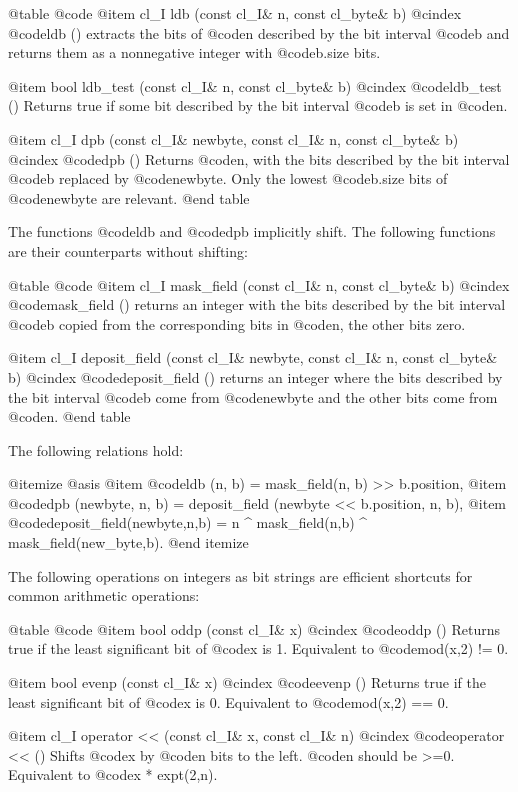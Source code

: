 @table @code
@item cl_I ldb (const cl_I& n, const cl_byte& b)
@cindex @code{ldb ()}
extracts the bits of @code{n} described by the bit interval @code{b}
and returns them as a nonnegative integer with @code{b.size} bits.

@item bool ldb_test (const cl_I& n, const cl_byte& b)
@cindex @code{ldb_test ()}
Returns true if some bit described by the bit interval @code{b} is set in
@code{n}.

@item cl_I dpb (const cl_I& newbyte, const cl_I& n, const cl_byte& b)
@cindex @code{dpb ()}
Returns @code{n}, with the bits described by the bit interval @code{b}
replaced by @code{newbyte}. Only the lowest @code{b.size} bits of
@code{newbyte} are relevant.
@end table

The functions @code{ldb} and @code{dpb} implicitly shift. The following
functions are their counterparts without shifting:

@table @code
@item cl_I mask_field (const cl_I& n, const cl_byte& b)
@cindex @code{mask_field ()}
returns an integer with the bits described by the bit interval @code{b}
copied from the corresponding bits in @code{n}, the other bits zero.

@item cl_I deposit_field (const cl_I& newbyte, const cl_I& n, const cl_byte& b)
@cindex @code{deposit_field ()}
returns an integer where the bits described by the bit interval @code{b}
come from @code{newbyte} and the other bits come from @code{n}.
@end table

The following relations hold:

@itemize @asis
@item
@code{ldb (n, b) = mask_field(n, b) >> b.position},
@item
@code{dpb (newbyte, n, b) = deposit_field (newbyte << b.position, n, b)},
@item
@code{deposit_field(newbyte,n,b) = n ^ mask_field(n,b) ^ mask_field(new_byte,b)}.
@end itemize

The following operations on integers as bit strings are efficient shortcuts
for common arithmetic operations:

@table @code
@item bool oddp (const cl_I& x)
@cindex @code{oddp ()}
Returns true if the least significant bit of @code{x} is 1. Equivalent to
@code{mod(x,2) != 0}.

@item bool evenp (const cl_I& x)
@cindex @code{evenp ()}
Returns true if the least significant bit of @code{x} is 0. Equivalent to
@code{mod(x,2) == 0}.

@item cl_I operator << (const cl_I& x, const cl_I& n)
@cindex @code{operator << ()}
Shifts @code{x} by @code{n} bits to the left. @code{n} should be >=0.
Equivalent to @code{x * expt(2,n)}.

